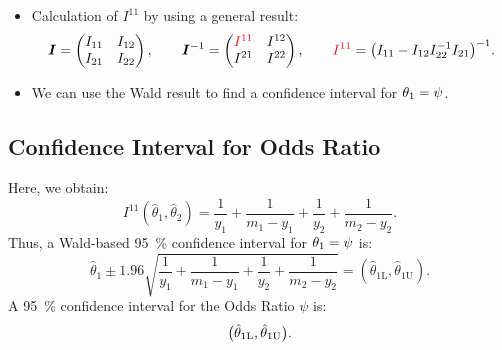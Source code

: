 \documentclass[oneside]{book}\usepackage[]{graphicx}\usepackage[svgnames]{xcolor}
\let\exp\relax%
\let\log\relax%
\providecommand{\Matrix}[1]{\bm{#1}}
\begin{document}
\begin{itemize}
      \item Calculation of $ I^{11} $ by using a general result:
            \[ \Matrix{I}=\begin{pmatrix}
                        I_{11} & I_{12} \\
                        I_{21} & I_{22}
                  \end{pmatrix},\qquad \Matrix{I}^{-1}=\begin{pmatrix}
                        \textcolor{Red}{I^{11}} & I^{12} \\
                        I^{21}                  & I^{22}
                  \end{pmatrix},\qquad \textcolor{Red}{I^{11}}=\bigl(I_{11}-I_{12}I_{22}^{-1}I_{21}\bigr)^{-1}. \]
      \item We can use the Wald result to find a confidence interval for $ \theta_1=\log{\psi} $.
\end{itemize}
\subsection*{Confidence Interval for Odds Ratio}
Here, we obtain:
\[ I^{11}(\hat{\theta}_1,\hat{\theta}_2)=\frac{1}{y_1} +\frac{1}{m_1-y_1}+\frac{1}{y_2}+\frac{1}{m_2-y_2}. \]
Thus, a Wald-based \qty{95}{\percent} confidence interval for $ \theta_1=\log{\psi} $ is:
\[ \hat{\theta}_1\pm 1.96\sqrt{\frac{1}{y_1} +\frac{1}{m_1-y_1} +\frac{1}{y_2} +\frac{1}{m_2-y_2}}=(\hat{\theta}_{1\text{L}},\hat{\theta}_{1\text{U}}). \]
A \qty{95}{\percent} confidence interval for the Odds Ratio $ \psi $ is:
\[ \bigl(\exp{\hat{\theta}_{1\text{L}}},\exp{\hat{\theta}_{1\text{U}}}\bigr). \]
\end{document}
